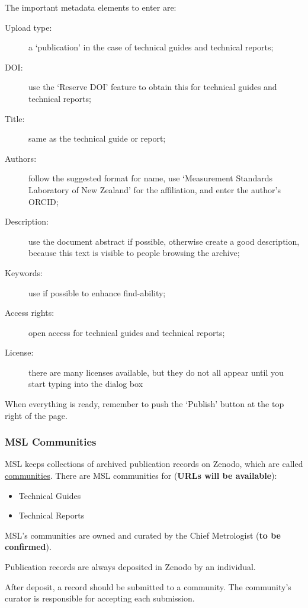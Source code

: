 {The important metadata elements to enter are:
\begin{description}
    \item[Upload type:] a `publication' in the case of technical guides and technical reports;
    \item[DOI:] use the `Reserve DOI' feature to obtain this for technical guides and technical reports;
    \item[Title:] same as the technical guide or report;
    \item[Authors:] follow the suggested format for name, use `Measurement Standards Laboratory of New Zealand' for the affiliation, and enter the author's ORCID;
    \item[Description:] use the document abstract if possible, otherwise create a good description, because this text is visible to people browsing the archive;
    \item[Keywords:] use if possible to enhance find-ability;
    \item[Access rights:] open access for technical guides and technical reports;
    \item[License:] there are many licenses available, but they do not all appear until you start typing into the dialog box  
\end{description}

When everything is ready, remember to push the `Publish' button at the top right of the page.

\subsubsection{MSL Communities} MSL keeps collections of archived publication records on Zenodo, which are called \href{https://help.zenodo.org/docs/communities/about-communities/}{communities}. There are MSL communities for (\textbf{URLs will be available}):
\begin{itemize}
    \item Technical Guides
    \item Technical Reports
\end{itemize}

MSL's communities are owned and curated by the Chief Metrologist (\textbf{to be confirmed}). 

Publication records are always deposited in Zenodo by an individual. 

After deposit, a record should be submitted to a community. The community's curator is responsible for accepting each submission. 

}
